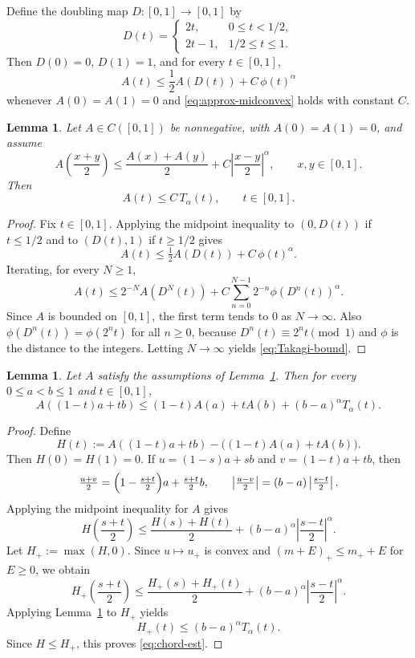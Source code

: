 \documentclass[11pt]{amsart}
\newtheorem{lemma}[theorem]{Lemma}
\theoremstyle{definition}
\renewcommand{\1}{{\mathbbm{1}}}
\begin{document}
Define the doubling map $D:[0,1]\to[0,1]$ by
\[
D(t)=
\begin{cases}
2t, & 0\le t<1/2,\\
2t-1, & 1/2\le t\le 1.
\end{cases}
\]
Then $D(0)=0$, $D(1)=1$, and for every $t\in[0,1]$,
\[
A(t)\le \frac12 A(D(t)) + C\,\phi(t)^\alpha
\]
whenever $A(0)=A(1)=0$ and \eqref{eq:approx-midconvex} holds with constant $C$.

\begin{lemma}\label{lem:Takagi-bound-A}
Let $A\in C([0,1])$ be nonnegative, with $A(0)=A(1)=0$, and assume
\[
A\!\left(\frac{x+y}{2}\right)
\le
\frac{A(x)+A(y)}{2}
+
C\left|\frac{x-y}{2}\right|^\alpha,
\qquad x,y\in[0,1].
\]
Then
\begin{equation}\label{eq:Takagi-bound}
A(t)\le C\,T_\alpha(t),
\qquad t\in[0,1].
\end{equation}
\end{lemma}

\begin{proof}
Fix $t\in[0,1]$. Applying the midpoint inequality to $(0,D(t))$ if $t\le1/2$
and to $(D(t),1)$ if $t\ge1/2$ gives
\[
A(t)\le \tfrac12 A(D(t))+C\,\phi(t)^\alpha.
\]
Iterating, for every $N\ge1$,
\[
A(t)\le 2^{-N}A(D^N(t))+C\sum_{n=0}^{N-1}2^{-n}\phi(D^n(t))^\alpha.
\]
Since $A$ is bounded on $[0,1]$, the first term tends to $0$ as $N\to\infty$.
Also $\phi(D^n(t))=\phi(2^n t)$ for all $n\ge0$, because $D^n(t)\equiv 2^n t
\pmod 1$ and $\phi$ is the distance to the integers. Letting $N\to\infty$
yields \eqref{eq:Takagi-bound}.
\end{proof}

\begin{lemma}\label{lem:chord-est}
Let $A$ satisfy the assumptions of Lemma~\ref{lem:Takagi-bound-A}.
Then for every $0\le a<b\le1$ and $t\in[0,1]$,
\begin{equation}\label{eq:chord-est}
A((1-t)a+tb)
\le
(1-t)A(a)+tA(b)+(b-a)^\alpha T_\alpha(t).
\end{equation}
\end{lemma}

\begin{proof}
Define
\[
H(t):=A((1-t)a+tb)-\bigl((1-t)A(a)+tA(b)\bigr).
\]
Then $H(0)=H(1)=0$. If $u=(1-s)a+sb$ and $v=(1-t)a+tb$, then
\[
\tfrac{u+v}{2}=\Bigl(1-\tfrac{s+t}{2}\Bigr)a+\tfrac{s+t}{2}b,
\qquad
\left|\tfrac{u-v}{2}\right|=(b-a)\left|\tfrac{s-t}{2}\right|.
\]
Applying the midpoint inequality for $A$ gives
\[
H\!\left(\frac{s+t}{2}\right)
\le
\frac{H(s)+H(t)}{2}
+
(b-a)^\alpha\left|\frac{s-t}{2}\right|^\alpha.
\]
Let $H_+:=\max(H,0)$. Since $u\mapsto u_+$ is convex and
$(m+E)_+\le m_+ + E$ for $E\ge0$, we obtain
\[
H_+\!\left(\frac{s+t}{2}\right)
\le
\frac{H_+(s)+H_+(t)}{2}
+
(b-a)^\alpha\left|\frac{s-t}{2}\right|^\alpha.
\]
Applying Lemma~\ref{lem:Takagi-bound-A} to $H_+$ yields
\[
H_+(t)\le (b-a)^\alpha T_\alpha(t).
\]
Since $H\le H_+$, this proves \eqref{eq:chord-est}.
\end{proof}
\end{document}
